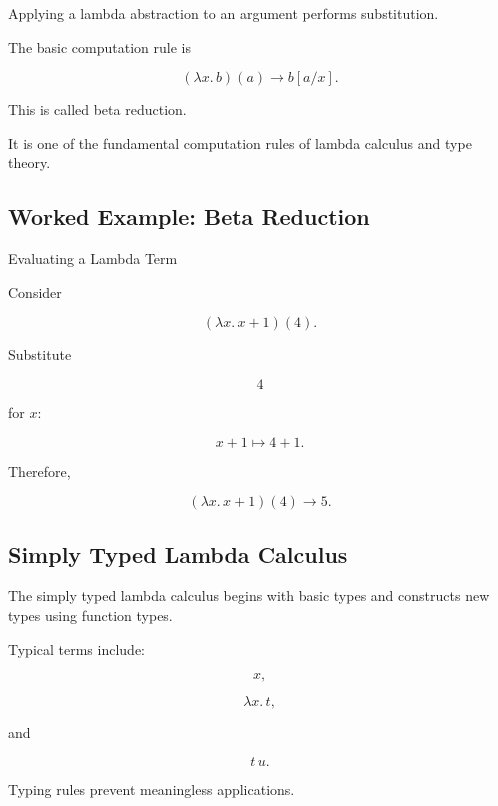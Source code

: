 Applying a lambda abstraction to an argument performs substitution.

The basic computation rule is

\[
\boxed{
(\lambda x.\,b)(a)
\longrightarrow
b[a/x].
}
\]

This is called beta reduction.

It is one of the fundamental computation rules of lambda calculus and type
theory.

\subsection{Worked Example: Beta Reduction}
\label{subsec:worked-beta-reduction}

\begin{workedexamplebox}{Evaluating a Lambda Term}

Consider

\[
(\lambda x.\,x+1)(4).
\]

Substitute

\[
4
\]

for \(x\):

\[
x+1
\longmapsto
4+1.
\]

Therefore,

\begin{answerbox}
\[
\boxed{
(\lambda x.\,x+1)(4)
\longrightarrow
5.
}
\]
\end{answerbox}

\end{workedexamplebox}

\subsection{Simply Typed Lambda Calculus}
\label{subsec:simply-typed-lambda-calculus}

The simply typed lambda calculus begins with basic types and constructs new
types using function types.

Typical terms include:

\[
\boxed{
x,
}
\]

\[
\boxed{
\lambda x.\,t,
}
\]

and

\[
\boxed{
t\,u.
}
\]

Typing rules prevent meaningless applications.


